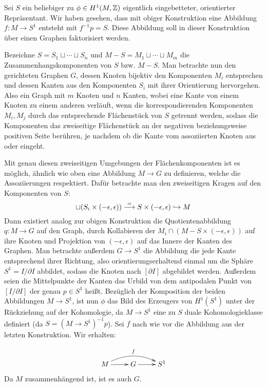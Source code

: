 \begin{constr}
	\label{constr:graph}
	Sei $S$ ein beliebiger zu $\phi \in H^1(M,\mathbb{Z})$ eigentlich eingebetteter, orientierter Repräsentant. Wir haben gesehen, dass mit obiger Konstruktion eine Abbildung $f:M\to S^1$ entsteht mit $f^{-1}p=S$. Diese Abbildung soll in dieser Konstruktion über einen Graphen faktorisiert werden.

	Bezeichne $S=S_1\sqcup \cdots \sqcup S_n$ und $M-S = M_1 \sqcup \cdots \sqcup M_m$ die Zusammenhangskomponenten von $S$ bzw. $M-S$. Man betrachte nun den gerichteten Graphen $G$, dessen Knoten bijektiv den Komponenten $M_i$ entsprechen und dessen Kanten aus den Komponenten $S_i$ mit ihrer Orientierung hervorgehen. Also ein Graph mit $m$ Knoten und $n$ Kanten, wobei eine Kante von einem Knoten zu einem anderen verläuft, wenn die korrespondierenden Komponenten $M_i, M_j$ durch das entsprechende Flächenstück von $S$ getrennt werden, sodass die Komponenten das zweiseitige Flächenstück an der negativen beziehungsweise positiven Seite berühren, je nachdem ob die Kante vom assoziierten Knoten aus oder eingeht.

	Mit genau diesen zweiseitigen Umgebungen der Flächenkomponenten ist es möglich, ähnlich wie oben eine Abbildung $M \to G$ zu definieren, welche die Assoziierungen respektiert. Dafür betrachte man den zweiseitigen Kragen auf den Komponenten von $S$:
	\[
		\sqcup (S_i \times (-\epsilon,\epsilon)) \stackrel = \longrightarrow S \times (-\epsilon,\epsilon) \hookrightarrow M
	\]
	Dann existiert analog zur obigen Konstruktion die Quotientenabbildung $q:M\to G$ auf den Graph, durch Kollabieren der $M_i\cap (M -S \times(-\epsilon,\epsilon))$ auf ihre Knoten und Projektion von $(-\epsilon,\epsilon)$ auf das Innere der Kanten des Graphen. Man betrachte außerdem $G \to S^1$ die Abbildung die jede Kante entsprechend ihrer Richtung, also orientierungserhaltend einmal um die Sphäre $S^1 = I/\partial I$ abbildet, sodass die Knoten nach $[\partial I]$ abgebildet werden. Außerdem seien die Mittelpunkte der Kanten das Urbild von dem antipodalen Punkt von $[I/\partial I]$ der genau $p\in S^1$ heißt. Bezüglich der Komposition der beiden Abbildungen $M \to S^1$, ist nun $\phi$ das Bild des Erzeugers von $H^1(S^1)$ unter der Rückziehung auf der Kohomologie, da $M \to S^1$ eine zu $S$ duale Kohomologieklasse definiert (da $S=(M\to S^1)^{-1}p$). Sei $f$ nach wie vor die Abbildung aus der letzten Konstruktion. Wir erhalten:
	
	\begin{align}
		\begin{xy}
				\xymatrix{M \ar[r] \ar@/^1pc/[rr]^f & G \ar[r] & S^1 }
			\end{xy}
		\label{eq:graphlift}
	\end{align}
	Da $M$ zusammenhängend ist, ist es auch $G$.
\end{constr}

